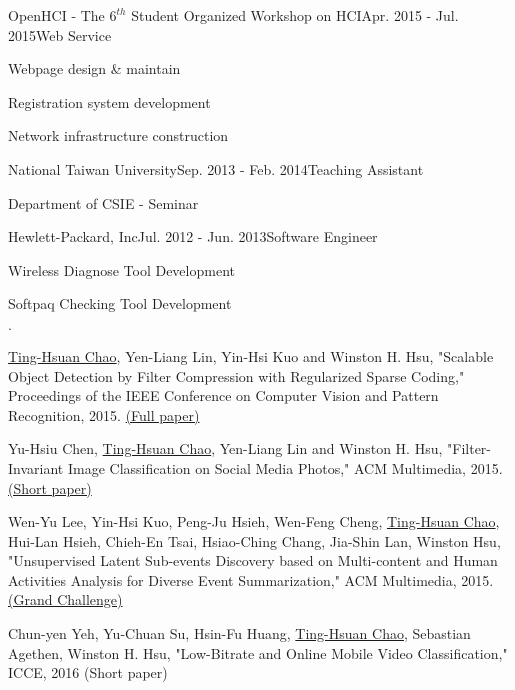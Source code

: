 \documentclass{joel_cv}
\begin{document}
\begin{sectionContentNormal}{OpenHCI - The $6^{th}$ Student Organized Workshop on HCI}{Apr. 2015 - Jul. 2015}{Web Service}
	\item Webpage design \& maintain
	\item Registration system development
	\item Network infrastructure construction
\end{sectionContentNormal}

\begin{sectionContentNormal}{National Taiwan University}{Sep. 2013 - Feb. 2014}{Teaching Assistant}
	\item Department of CSIE - Seminar
\end{sectionContentNormal}

\begin{sectionContentNormal}{Hewlett-Packard, Inc}{Jul. 2012 - Jun. 2013}{Software Engineer}
	\item Wireless Diagnose Tool Development
	\item Softpaq Checking Tool Development
\end{sectionContentNormal}

%
%

\begin{sectionItemize}{$\cdot$}
	\item \underline{Ting-Hsuan Chao}, Yen-Liang Lin, Yin-Hsi Kuo and Winston H. Hsu, "Scalable Object Detection by Filter Compression with Regularized Sparse Coding," Proceedings of the IEEE Conference on Computer Vision and Pattern Recognition, 2015. \href{http://www.cv-foundation.org/openaccess/content_cvpr_2015/html/Chao_Scalable_Object_Detection_2015_CVPR_paper.html}{(Full paper)}
	\item Yu-Hsiu Chen, \underline{Ting-Hsuan Chao},  Yen-Liang Lin and Winston H. Hsu, "Filter-Invariant Image Classification on Social Media Photos," ACM Multimedia, 2015. \href{http://dl.acm.org/citation.cfm?id=2806348}{(Short paper)}
	\item Wen-Yu Lee, Yin-Hsi Kuo, Peng-Ju Hsieh, Wen-Feng Cheng, \underline{Ting-Hsuan Chao}, Hui-Lan Hsieh, Chieh-En Tsai, Hsiao-Ching Chang, Jia-Shin Lan, Winston Hsu, "Unsupervised Latent Sub-events Discovery based on Multi-content and Human Activities Analysis for Diverse Event Summarization,"  ACM Multimedia, 2015. \href{http://dl.acm.org/citation.cfm?id=2809935}{(Grand Challenge)}
	\item Chun-yen Yeh, Yu-Chuan Su, Hsin-Fu Huang, \underline{Ting-Hsuan Chao}, Sebastian Agethen, Winston H. Hsu, "Low-Bitrate and Online Mobile Video Classification," ICCE, 2016 (Short paper)
\end{sectionItemize}
\end{document}
